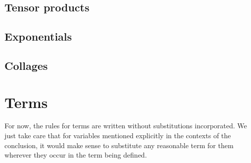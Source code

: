 \documentclass{amsart}
\begin{document}
\subsection{Tensor products}
\label{sec:tensor-products}

\subsection{Exponentials}
\label{sec:exponentials}

\subsection{Collages}
\label{sec:collages}



\section{Terms}

For now, the rules for terms are written without substitutions incorporated.
We just take care that for variables mentioned explicitly in the contexts of the conclusion, it would make sense to substitute any reasonable term for them wherever they occur in the term being defined.
\end{document}
